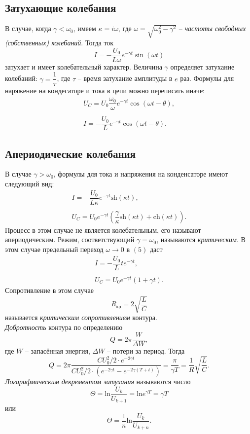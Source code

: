\documentclass[11pt]{article}
\begin{document}
\subsection*{Затухающие колебания}
 В случае, когда $\gamma < \omega_0$, имеем $\kappa = i\omega$, где $\omega = \sqrt{\omega_0^2 - \gamma^2}$ -- \textit{частоты свободных (собственных) колебаний}. Тогда ток
 \begin{equation}
 I = -\dfrac{U_0}{L\omega}e^{-\gamma t}\sin(\omega t)
 \end{equation}
 затухает и имеет колебательный характер. Величина $\gamma$ определяет затухание колебаний: $\gamma = \dfrac{1}{\tau}$, где $\tau$ -- время затухание амплитуды в $e$ раз.
Формулы для наряжение на кондесаторе и тока в цепи можно переписать иначе:
\begin{equation}
\begin{array}{c}
U_C = U_0 \dfrac{\omega_0}{\omega}e^{-\gamma t} \cos(\omega t - \theta),\\
\\
I = -\dfrac{U_0}{L}e^{-\gamma t} \cos(\omega t - \theta).
\end{array}
\end{equation}

\subsection*{Апериодические колебания}
В случае $\gamma > \omega_0$, формулы для тока и напряжения на конденсаторе имеют следующий вид:
$$
\begin{array}{c}
I = -\dfrac{U_0}{L\kappa}e^{-\gamma t}\text{sh}(\kappa t),\\
\\
U_C = U_0 e^{-\gamma t}\left( \dfrac{\gamma}{\kappa}\text{sh}(\kappa t) + \text{ch}(\kappa t) \right).
\end{array}
$$
Процесс в этом случае не является колебательным, его называют апериодическим. Режим, соответствующий $\gamma = \omega_0$, называются \textit{критическим}. В этом случае предельный переход $\omega \rightarrow 0$ в $(5)$ даст 
$$
\begin{array}{c}
I = -\dfrac{U_0}{L}te^{-\gamma t},\\
\\
U_C=U_0 e^{-\gamma t}(1+\gamma t).
\end{array}
$$
Сопротивление в этом случае 
\begin{equation}
R_{\text{кр}}= 2 \sqrt{\dfrac{L}{C}}
\end{equation}
называется \textit{критическим сопротивлением} контура.\\
\textit{Добротность} контура по определению 
$$
Q = 2\pi \dfrac{W}{\Delta W},
$$ 
где $W$ -- запасённая энергия, $\Delta W$ -- потери за период. Тогда
$$
Q = 2\pi\dfrac{CU_0^2/2 \cdot e^{-2\gamma t}}{CU_0^2/2 \cdot (e^{-2\gamma t} - e^{-2\gamma (T+t)})}=\dfrac{\pi}{\gamma T}=\dfrac{1}{R}\sqrt{\dfrac{L}{C}}.
$$
\textit{Логарифмическим декрементом затухания} называются число
$$
\Theta = \text{ln}\dfrac{U_k}{U_{k+1}}=\text{ln} e^{\gamma T}=\gamma T
$$
или 
$$
\Theta = \dfrac{1}{n} \text{ln}\dfrac{U_k}{U_{k+n}}.
$$
\newpage
\end{document}
